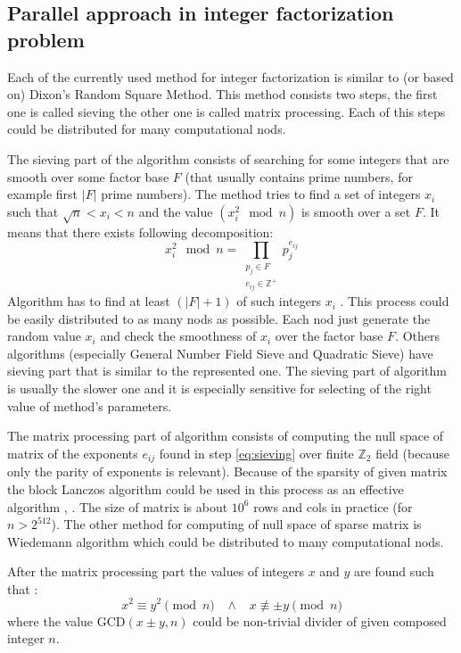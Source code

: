 \documentclass[conference]{IEEEtran}
\begin{document}
\subsection{Parallel approach in integer factorization problem}
Each of the currently used method for integer factorization is similar to (or based on) Dixon's Random Square Method. This method consists two steps, the first one is called sieving the other one is called matrix processing. Each of this steps could be distributed for many computational nods.

The sieving part of the algorithm consists of searching for some integers that are smooth over some factor base $F$ (that usually contains prime numbers, for example first $|F|$ prime numbers). The method tries to find a set of integers $x_i$ such that $\sqrt{n} < x_i < n$ and the value $(x_i^2 \mod n)$ is smooth over a set $F$. It means that there exists following decomposition:
\begin{equation} \label{eq:sieving}
x_i^2 \mod n = \prod_{ \substack{p_j \in F \\ e_{ij} \in \mathbb{Z}^+} } p_j^{e_{ij}}
\end{equation} 
Algorithm has to find at least $\left ( |F|+1 \right)$ of such integers $x_i$ \cite{yan}. This process could be easily distributed to as many nods as possible. Each nod just generate the random value $x_i$ and check the smoothness of $x_i$ over the factor base $F$. Others algorithms (especially General Number Field Sieve and Quadratic Sieve) have sieving part that is similar to the represented one. The sieving part of algorithm is usually the slower one and it is especially sensitive for selecting of the right value of method's parameters. 

The matrix processing part of algorithm consists of computing the null space of matrix of the exponents $e_{ij}$ found in step \eqref{eq:sieving} over finite $\mathbb{Z}_2$ field (because only the parity of exponents is relevant). Because of the sparsity of given matrix the block Lanczos algorithm could be used in this process as an effective algorithm \cite{lanczos}, \cite{hoang}. The size of matrix is about $10^6$ rows and cols in practice (for $n > 2^{512}$). The other method for computing of null space of sparse matrix is Wiedemann algorithm \cite{wiedemann} which could be distributed to many computational nods.

After the matrix processing part the values of integers $x$ and $y$ are found such that \cite{yan}:
\begin{equation}
x^2 \equiv y^2 \pmod{n} \hspace{10pt} \land \hspace{10pt} x \not\equiv \pm y \pmod{n}
\end{equation}
where the value $\mathrm{GCD}(x\pm y, n)$ could be non-trivial divider of given composed integer $n$.
\end{document}
